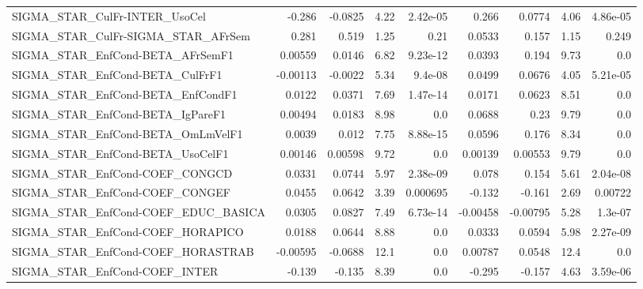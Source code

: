 \begin{tabular}{lrrrrrrrr}
SIGMA\_STAR\_CulFr-INTER\_UsoCel         &      -0.286 &      -0.0825 &    4.22 & 2.42e-05 &      0.266 &      0.0774 &         4.06 &      4.86e-05 \\
SIGMA\_STAR\_CulFr-SIGMA\_STAR\_AFrSem    &       0.281 &        0.519 &    1.25 &     0.21 &     0.0533 &       0.157 &         1.15 &         0.249 \\
SIGMA\_STAR\_EnfCond-BETA\_AFrSemF1      &     0.00559 &       0.0146 &    6.82 & 9.23e-12 &     0.0393 &       0.194 &         9.73 &           0.0 \\
SIGMA\_STAR\_EnfCond-BETA\_CulFrF1       &    -0.00113 &      -0.0022 &    5.34 &  9.4e-08 &     0.0499 &      0.0676 &         4.05 &      5.21e-05 \\
SIGMA\_STAR\_EnfCond-BETA\_EnfCondF1     &      0.0122 &       0.0371 &    7.69 & 1.47e-14 &     0.0171 &      0.0623 &         8.51 &           0.0 \\
SIGMA\_STAR\_EnfCond-BETA\_IgPareF1      &     0.00494 &       0.0183 &    8.98 &      0.0 &     0.0688 &        0.23 &         9.79 &           0.0 \\
SIGMA\_STAR\_EnfCond-BETA\_OmLmVelF1     &      0.0039 &        0.012 &    7.75 & 8.88e-15 &     0.0596 &       0.176 &         8.34 &           0.0 \\
SIGMA\_STAR\_EnfCond-BETA\_UsoCelF1      &     0.00146 &      0.00598 &    9.72 &      0.0 &    0.00139 &     0.00553 &         9.79 &           0.0 \\
SIGMA\_STAR\_EnfCond-COEF\_CONGCD        &      0.0331 &       0.0744 &    5.97 & 2.38e-09 &      0.078 &       0.154 &         5.61 &      2.04e-08 \\
SIGMA\_STAR\_EnfCond-COEF\_CONGEF        &      0.0455 &       0.0642 &    3.39 & 0.000695 &     -0.132 &      -0.161 &         2.69 &       0.00722 \\
SIGMA\_STAR\_EnfCond-COEF\_EDUC\_BASICA   &      0.0305 &       0.0827 &    7.49 & 6.73e-14 &   -0.00458 &    -0.00795 &         5.28 &       1.3e-07 \\
SIGMA\_STAR\_EnfCond-COEF\_HORAPICO      &      0.0188 &       0.0644 &    8.88 &      0.0 &     0.0333 &      0.0594 &         5.98 &      2.27e-09 \\
SIGMA\_STAR\_EnfCond-COEF\_HORASTRAB     &    -0.00595 &      -0.0688 &    12.1 &      0.0 &    0.00787 &      0.0548 &         12.4 &           0.0 \\
SIGMA\_STAR\_EnfCond-COEF\_INTER         &      -0.139 &       -0.135 &    8.39 &      0.0 &     -0.295 &      -0.157 &         4.63 &      3.59e-06 \\

\end{tabular}
